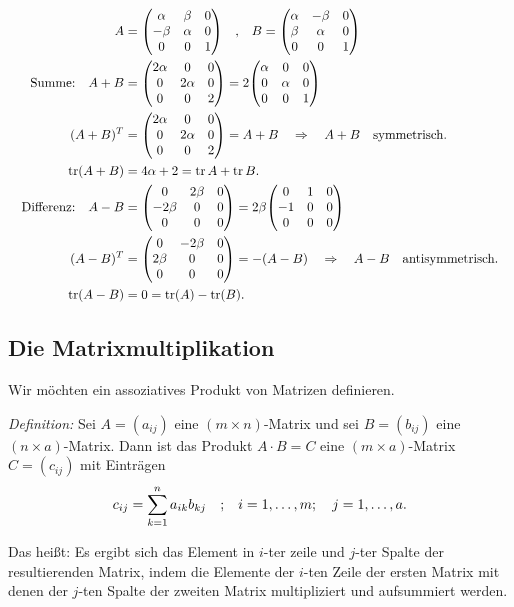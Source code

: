 \begin{align}
    A &= \mqty(\alpha & \beta & 0 \\ -\beta &\alpha & 0 \\ 0 & 0 & 1) \qq{,} B = \mqty(\alpha & -\beta & 0 \\ \beta &\alpha & 0 \\ 0 & 0 & 1) \notag \\
    \qq{Summe:} A+ B &= \mqty(\dmat[0]{2\alpha, 2\alpha, 2}) = 2 \mqty(\dmat[0]{\alpha,\alpha,1}) \\
    (A+B)^T &= \mqty(\dmat[0]{2\alpha, 2\alpha, 2}) = A + B \quad \Rightarrow \quad A+B \qq{symmetrisch.} \notag \\
    \trace(A+B) &= 4\alpha +2 = \trace{A} + \trace{B}. \notag \\
    \qq{Differenz:} A- B &= \mqty(0 & 2\beta & 0 \\ -2\beta & 0 & 0 \\ 0 & 0 &0) = 2\beta \mqty(0 & 1 & 0 \\ -1 & 0 & 0 \\ 0 & 0 &0) \\
    (A-B)^T &= \mqty(0 & -2\beta & 0 \\ 2\beta & 0 & 0 \\ 0 & 0 &0) = -(A - B) \quad \Rightarrow \quad A-B \qq{antisymmetrisch.} \notag \\
    \trace(A-B) &= 0 = \trace(A) - \trace(B).\notag
\end{align}

\subsection{Die Matrixmultiplikation}

Wir möchten ein assoziatives Produkt von Matrizen definieren. 

\emph{Definition:} Sei $A = (a_{ij})$ eine $(m\times n)$-Matrix und sei $B = (b_{ij})$ eine $(n\times a)$-Matrix. Dann ist das Produkt $A\cdot B = C$ eine $(m\times a)$-Matrix $C = (c_{ij})$ mit Einträgen 
\begin{align}
    c_{ij} = \sum_{k=1}^n a_{ik} b_{kj} \qq{;} i=1,\hdots,m; \quad j = 1,\hdots,a. 
\end{align}

Das heißt: Es ergibt sich das Element in $i$-ter zeile und $j$-ter Spalte der resultierenden Matrix, indem die Elemente der $i$-ten Zeile der ersten Matrix mit denen der $j$-ten Spalte der zweiten Matrix multipliziert und aufsummiert werden. 

